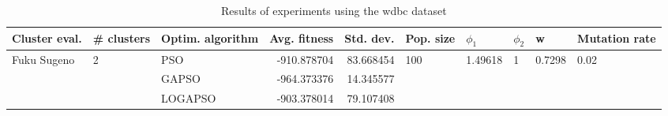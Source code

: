 \begin{table}
\centering
\caption{Results of experiments using the wdbc dataset}
\begin{tabular}{lllrrlllll}
\toprule
               Cluster eval. &        \# clusters & Optim. algorithm &  Avg. fitness &  Std. dev. &            Pop. size &               $\phi_{1}$ &         $\phi_{2}$ &                       w &         Mutation rate \\
\midrule
\multirow{3}{*}{Fuku Sugeno} & \multirow{3}{*}{2} &              PSO &   -910.878704 &  83.668454 & \multirow{3}{*}{100} & \multirow{3}{*}{1.49618} & \multirow{3}{*}{1} & \multirow{3}{*}{0.7298} & \multirow{3}{*}{0.02} \\
                             &                    &            GAPSO &   -964.373376 &  14.345577 &                      &                          &                    &                         &                       \\
                             &                    &          LOGAPSO &   -903.378014 &  79.107408 &                      &                          &                    &                         &                       \\
\bottomrule
\end{tabular}
\end{table}
